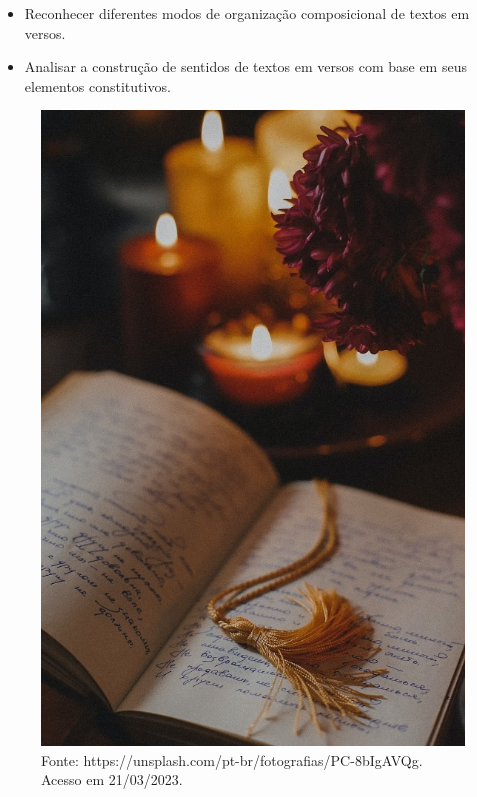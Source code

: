 
\begin{itemize}
\item Reconhecer diferentes modos de organização composicional de textos em
versos.

\item Analisar a construção de sentidos de textos em versos com base em seus
elementos constitutivos.
\end{itemize}

\begin{figure}[htpb!]
\includegraphics[width=.5\textwidth]{./imgs/img16.jpg}
\caption{Fonte: https://unsplash.com/pt-br/fotografias/PC-8bIgAVQg. Acesso em 21/03/2023.}
\end{figure}

